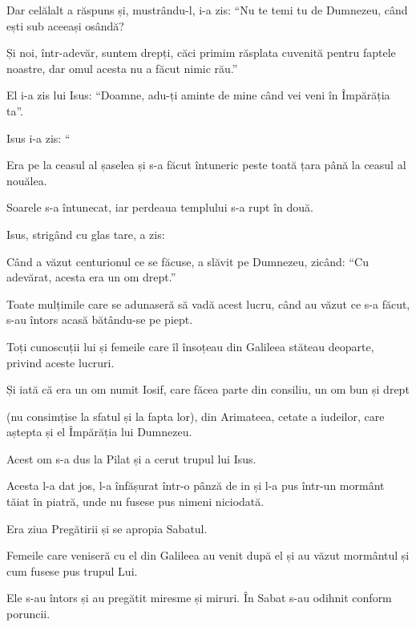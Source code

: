 {\par }{\PP {}Dar celălalt a răspuns și, mustrându-l, i-a zis: “Nu te temi tu de Dumnezeu, când ești sub aceeași osândă?

Și noi, într-adevăr, suntem drepți, căci primim răsplata cuvenită pentru faptele noastre, dar omul acesta nu a făcut nimic rău.”

El i-a zis lui Isus: “Doamne, adu-ți aminte de mine când vei veni în Împărăția ta”.


\par }{\PP {}Isus i-a zis: “{}


\par }{\PP {}Era pe la ceasul al șaselea și s-a făcut întuneric peste toată țara până la ceasul al nouălea.

Soarele s-a întunecat, iar perdeaua templului s-a rupt în două.

Isus, strigând cu glas tare, a zis:
{}


\par }{\PP {}Când a văzut centurionul ce se făcuse, a slăvit pe Dumnezeu, zicând: “Cu adevărat, acesta era un om drept.”

Toate mulțimile care se adunaseră să vadă acest lucru, când au văzut ce s-a făcut, s-au întors acasă bătându-se pe piept.

Toți cunoscuții lui și femeile care îl însoțeau din Galileea stăteau deoparte, privind aceste lucruri.


\par }{\PP {}Și iată că era un om numit Iosif, care făcea parte din consiliu, un om bun și drept

(nu consimțise la sfatul și la fapta lor), din Arimateea, cetate a iudeilor, care aștepta și el Împărăția lui Dumnezeu.

Acest om s-a dus la Pilat și a cerut trupul lui Isus.

Acesta l-a dat jos, l-a înfășurat într-o pânză de in și l-a pus într-un mormânt tăiat în piatră, unde nu fusese pus nimeni niciodată.

Era ziua Pregătirii și se apropia Sabatul.

Femeile care veniseră cu el din Galileea au venit după el și au văzut mormântul și cum fusese pus trupul Lui.

Ele s-au întors și au pregătit miresme și miruri. În Sabat s-au odihnit conform poruncii.



}
